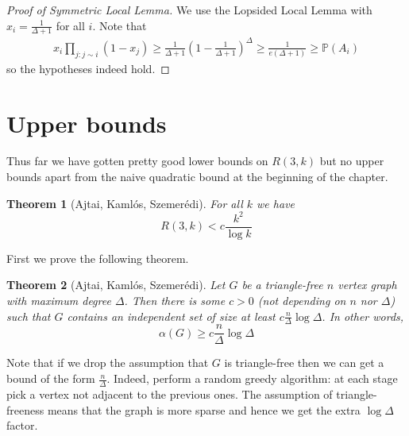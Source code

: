 \documentclass{report}
\theoremstyle{definition}
\theoremstyle{plain}
\newtheorem{thm}{Theorem}
\theoremstyle{definition}
\begin{document}
	\begin{proof}[Proof of Symmetric Local Lemma]
		We use the Lopsided Local Lemma with $x_i = \frac{1}{\Delta + 1}$ for all $i$. Note that
		\begin{align*}
			x_i \prod_{j\colon j\sim i}(1- x_j) \geq \frac{1}{\Delta + 1}\left(1 - \frac{1}{\Delta + 1}\right)^\Delta \geq \frac{1}{e(\Delta + 1)} \geq \mathbb{P}(A_i)
		\end{align*}
		so the hypotheses indeed hold.
	\end{proof}
	\section{Upper bounds}
	Thus far we have gotten pretty good lower bounds on $R(3,k)$ but no upper bounds apart from the naive quadratic bound at the beginning of the chapter. 
	\begin{thm}[Ajtai, Kamlós, Szemerédi]\label{thm:AKS_R3k}
		For all $k$ we have
		\[
			R(3,k) < c \frac{k^2}{\log k}
		\]
	\end{thm}
	First we prove the following theorem.
	\begin{thm}[Ajtai, Kamlós, Szemerédi]\label{thm:AKS_ind_trian_free}
		Let $G$ be a triangle-free $n$ vertex graph with maximum degree $\Delta$. Then there is some $c>0$ (not depending on $n$ nor $\Delta$) such that $G$ contains an independent set of size at least $c \frac{n}{\Delta} \log \Delta$. In other words,
		\[
			\alpha(G) \geq c \frac{n}{\Delta} \log \Delta
		\]
	\end{thm}
	Note that if we drop the assumption that $G$ is triangle-free then we can get a bound of the form $\frac{n}{\Delta}$. Indeed, perform a random greedy algorithm: at each stage pick a vertex not adjacent to the previous ones. The assumption of triangle-freeness means that the graph is more sparse and hence we get the extra $\log \Delta$ factor. 
	
\end{document}
